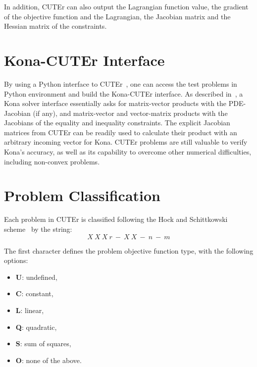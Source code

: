 In addition, CUTEr can also output 
the Lagrangian function value, the gradient of the objective function and the Lagrangian, the Jacobian matrix and the Hessian matrix of the constraints. 

\section{Kona-CUTEr Interface}\label{sec:konacut}
By using a Python interface to CUTEr~\cite{cuter_python}, one can access the test problems in Python environment and build the Kona-CUTEr interface. As described in~\cite{dener:scitech2016}, a Kona solver interface essentially asks for matrix-vector products with the PDE-Jacobian (if any),  
 and matrix-vector and vector-matrix products with the Jacobians of the equality and inequality constraints. 
The explicit Jacobian matrices from CUTEr can be readily used to calculate their product with an arbitrary incoming vector for Kona.  CUTEr problems are still valuable to verify Kona's accuracy, as well as its capability to overcome other numerical difficulties, including non-convex problems. 



\section{Problem Classification}\label{sec:cuter_clas}
Each problem in CUTEr is classified following the Hock and Schittkowski scheme~\cite{cuterScheme} by the string: 
\begin{equation*}
X \ X \ X \ r \ - \ X \ X \ - \ n \ - \ m
\end{equation*}

The first character defines the problem objective function type, with the following options: 
\begin{itemize}  \itemsep -8pt 
\item \textbf{U}: undefined,
\item  \textbf{C}: constant, 
\item \textbf{L}: linear, 
\item \textbf{Q}: quadratic, 
\item  \textbf{S}: sum of squares, 
\item  \textbf{O}: none of the above. 
\end{itemize}

